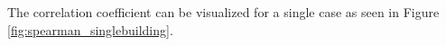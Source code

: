 The correlation coefficient can be visualized for a single case as seen in Figure \ref{fig:spearman_singlebuilding}.